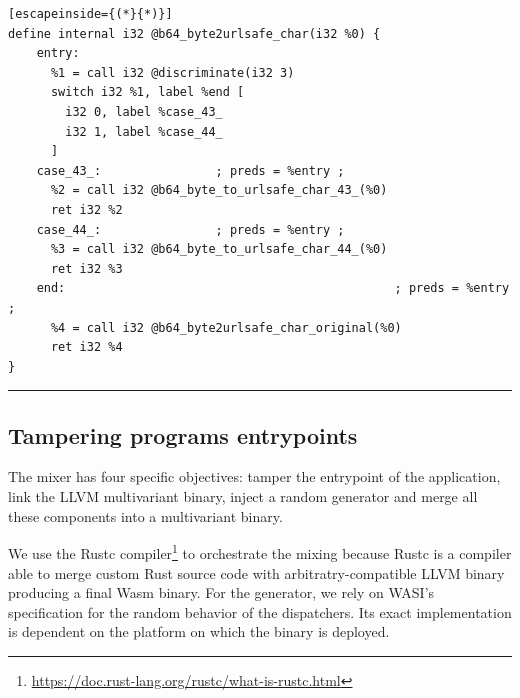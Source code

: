 \lstset{
    language=llvm,
    basicstyle=\footnotesize\ttfamily,
    columns=fullflexible,
    breaklines=true,
    numbers=none,
    stepnumber=1,
    float
}

\begin{code}
\scriptsize
\noindent\begin{minipage}[b]{\linewidth}
    \begin{minipage}[t]{1\linewidth}
        \begin{lstlisting}[escapeinside={(*}{*)}]
define internal i32 @b64_byte2urlsafe_char(i32 %0) {
    entry:
      %1 = call i32 @discriminate(i32 3)
      switch i32 %1, label %end [
        i32 0, label %case_43_
        i32 1, label %case_44_
      ]
    case_43_:                ; preds = %entry ;
      %2 = call i32 @b64_byte_to_urlsafe_char_43_(%0)
      ret i32 %2
    case_44_:                ; preds = %entry ;
      %3 = call i32 @b64_byte_to_urlsafe_char_44_(%0)
      ret i32 %3
    end:                                              ; preds = %entry ;
      %4 = call i32 @b64_byte2urlsafe_char_original(%0)
      ret i32 %4
}
        \end{lstlisting}
    \end{minipage}%
    
    \noindent\rule{\linewidth}{0.4pt}
    \label{listing:multivariant_template}
\end{minipage}
\end{code}


\subsection*{Tampering programs entrypoints}

The \tool mixer has four specific objectives: tamper the entrypoint of the application, link the LLVM multivariant binary, inject a random generator and merge all these components into a multivariant \wasm binary.


We use the Rustc compiler\footnote{\url{https://doc.rust-lang.org/rustc/what-is-rustc.html}} to orchestrate the mixing because Rustc is a compiler able to merge custom Rust source code with arbitratry-compatible LLVM binary producing a final Wasm binary.
For the generator, we rely on WASI's specification \cite{WASI} for the random behavior of the dispatchers. Its exact implementation is dependent on the platform on which the binary is deployed.

